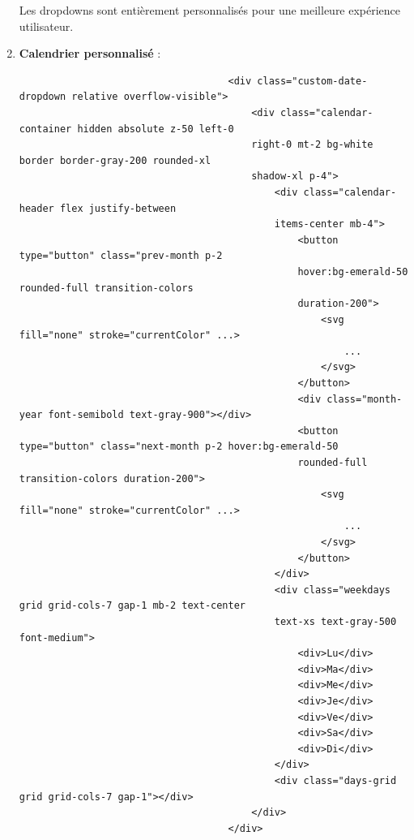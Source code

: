 \documentclass[a4paper,11pt]{article}
\begin{document}
\begin{enumerate}
                            \noindent Les dropdowns sont entièrement personnalisés pour une meilleure expérience utilisateur.

                        \item \textbf{Calendrier personnalisé} :
                            \begin{tcolorbox}[colback=lightgray!6, colframe=black, left=-70mm, right=5mm, top=2mm, bottom=0mm, boxrule=0.1mm]
                                \begin{verbatim}
                                    <div class="custom-date-dropdown relative overflow-visible">
                                        <div class="calendar-container hidden absolute z-50 left-0 
                                        right-0 mt-2 bg-white border border-gray-200 rounded-xl 
                                        shadow-xl p-4">
                                            <div class="calendar-header flex justify-between 
                                            items-center mb-4">
                                                <button type="button" class="prev-month p-2 
                                                hover:bg-emerald-50 rounded-full transition-colors
                                                duration-200">
                                                    <svg fill="none" stroke="currentColor" ...>
                                                        ...
                                                    </svg>
                                                </button>
                                                <div class="month-year font-semibold text-gray-900"></div>
                                                <button type="button" class="next-month p-2 hover:bg-emerald-50 
                                                rounded-full transition-colors duration-200">
                                                    <svg fill="none" stroke="currentColor" ...>
                                                        ...
                                                    </svg>
                                                </button>
                                            </div>
                                            <div class="weekdays grid grid-cols-7 gap-1 mb-2 text-center 
                                            text-xs text-gray-500 font-medium">
                                                <div>Lu</div>
                                                <div>Ma</div>
                                                <div>Me</div>
                                                <div>Je</div>
                                                <div>Ve</div>
                                                <div>Sa</div>
                                                <div>Di</div>
                                            </div>
                                            <div class="days-grid grid grid-cols-7 gap-1"></div>
                                        </div>
                                    </div>
                                \end{verbatim}
                            \end{tcolorbox}


\end{enumerate}
\end{document}
